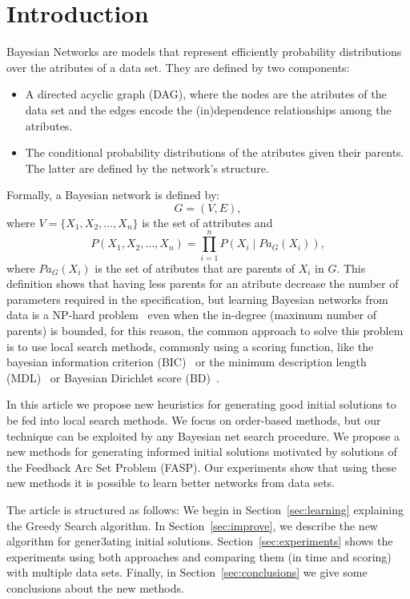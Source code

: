 \section{Introduction}
\label{sec:introduction}

Bayesian Networks are models that represent efficiently probability distributions over the atributes of a data set. They are defined by two components:
\begin{itemize}
	\item A directed acyclic graph (DAG), where the nodes are the atributes of the data set and the edges encode the (in)dependence relationships among the atributes.
	\item The conditional probability distributions of the atributes given their parents. The latter are defined by the network's structure.
\end{itemize}
Formally, a Bayesian network is defined by:
\[ G = ( V , E ), \]
where $V = \{ X_1 , X_2 , \ldots , X_n \}$  is the set of attributes and
\[ P( X_1 , X_2 , \ldots , X_n ) = \prod_{i=1}^{n} P( X_i \mid {Pa}_G( X_i ) ),  \]
where ${Pa}_G( X_i )$ is the set of atributes that are parents of $X_i$ in $G$. This definition shows that having less parents for an atribute decrease the number of parameters required in the specification, but learning Bayesian networks from data is a NP-hard problem~\cite{MSResearch04} even when the in-degree (maximum number of parents) is bounded, for this reason, the common approach to solve this problem is to use local search methods, commonly using a scoring function, like the bayesian information criterion (BIC)~\cite{BIC91} or the minimum description length (MDL)~\cite{MDL94} or Bayesian Dirichlet score (BD)~\cite{BD95}.


In this article we propose new heuristics for generating good initial solutions to be fed into local search methods. We focus on order-based methods, but our technique can be exploited by any Bayesian net search procedure. We propose a new methods for generating informed initial solutions motivated by solutions of the Feedback Arc Set Problem (FASP). Our experiments show that using these new methods it is possible to learn better networks from data sets.

The article is structured as follows: We begin in Section~\ref{sec:learning} explaining the Greedy Search algorithm. In Section~\ref{sec:improve}, we describe the new algorithm for gener3ating initial solutions. Section~\ref{sec:experiments} shows the experiments using both approaches and comparing them (in time and scoring) with multiple data sets. Finally, in Section~\ref{sec:conclusions} we give some conclusions about the new methods.